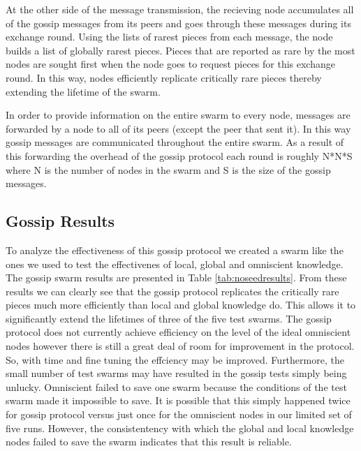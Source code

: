 At the other side of the message transmission, the recieving node
accumulates all of the gossip messages from its peers and goes
through these messages during its exchange round. Using the lists of
rarest pieces from each message, the node builds a list of globally
rarest pieces. Pieces that are reported as rare by the most nodes are
sought first when the node goes to request pieces for this exchange
round. In this way, nodes efficiently replicate critically rare pieces
thereby extending the lifetime of the swarm. 

In order to provide information on the entire swarm to every node,
messages are forwarded by a node to all of its peers (except the peer
that sent it). In this way gossip messages are communicated throughout
the entire swarm. As a result of this forwarding the overhead of the
gossip protocol each round is roughly N*N*S where N is the number of
nodes in the swarm and S is the size of the gossip messages.

\subsection{Gossip Results}

To analyze the effectiveness of this gossip protocol we created a
swarm like the ones we used to test the effectivenes of local, global
and omniscient knowledge. The gossip swarm results are presented in
Table \ref{tab:noseedresults}. From these results we can clearly see that the gossip
protocol replicates the critically rare pieces much more efficiently
than local and global knowledge do. This allows it to significantly extend the
lifetimes of three of the five test swarms. The gossip protocol does
not currently achieve efficiency on the level of the ideal omniscient
nodes however there is still a great deal of room for improvement
in the protocol. So, with time and fine tuning the effciency may be
improved. Furthermore, the small number of test swarms may have
resulted in the gossip tests simply being unlucky. Omniscient failed
to save one swarm because the conditions of the test swarm made it
impossible to save. It is possible that this simply happened twice for
gossip protocol versus just once for the omniscient nodes in our
limited set of five runs. However, the consistentency with which the
global and local knowledge nodes failed to save the swarm indicates
that this result is reliable.

%

